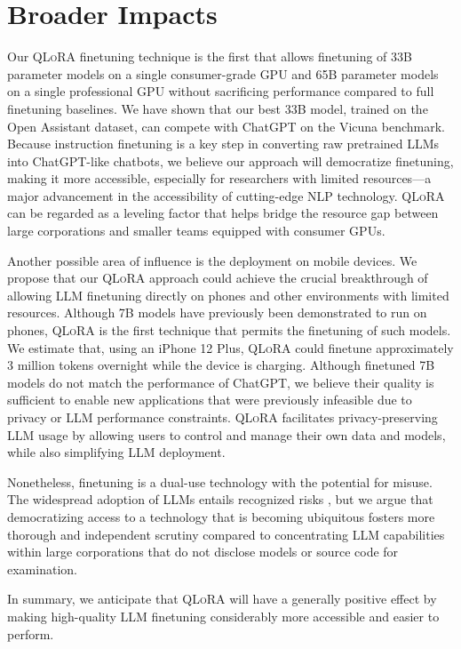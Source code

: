 \section{Broader Impacts}

Our \textsc{QLoRA} finetuning technique is the first that allows finetuning of 33B parameter models on a single consumer-grade GPU and 65B parameter models on a single professional GPU without sacrificing performance compared to full finetuning baselines. We have shown that our best 33B model, trained on the Open Assistant dataset, can compete with ChatGPT on the Vicuna benchmark. Because instruction finetuning is a key step in converting raw pretrained LLMs into ChatGPT-like chatbots, we believe our approach will democratize finetuning, making it more accessible, especially for researchers with limited resources—a major advancement in the accessibility of cutting-edge NLP technology. \textsc{QLoRA} can be regarded as a leveling factor that helps bridge the resource gap between large corporations and smaller teams equipped with consumer GPUs.

Another possible area of influence is the deployment on mobile devices. We propose that our \textsc{QLoRA} approach could achieve the crucial breakthrough of allowing LLM finetuning directly on phones and other environments with limited resources. Although 7B models have previously been demonstrated to run on phones, \textsc{QLoRA} is the first technique that permits the finetuning of such models. We estimate that, using an iPhone 12 Plus, \textsc{QLoRA} could finetune approximately 3 million tokens overnight while the device is charging. Although finetuned 7B models do not match the performance of ChatGPT, we believe their quality is sufficient to enable new applications that were previously infeasible due to privacy or LLM performance constraints. \textsc{QLoRA} facilitates privacy-preserving LLM usage by allowing users to control and manage their own data and models, while also simplifying LLM deployment.

Nonetheless, finetuning is a dual-use technology with the potential for misuse. The widespread adoption of LLMs entails recognized risks \citep{bommasani2021opportunities,bender2021dangers}, but we argue that democratizing access to a technology that is becoming ubiquitous fosters more thorough and independent scrutiny compared to concentrating LLM capabilities within large corporations that do not disclose models or source code for examination.

In summary, we anticipate that \textsc{QLoRA} will have a generally positive effect by making high-quality LLM finetuning considerably more accessible and easier to perform. 

